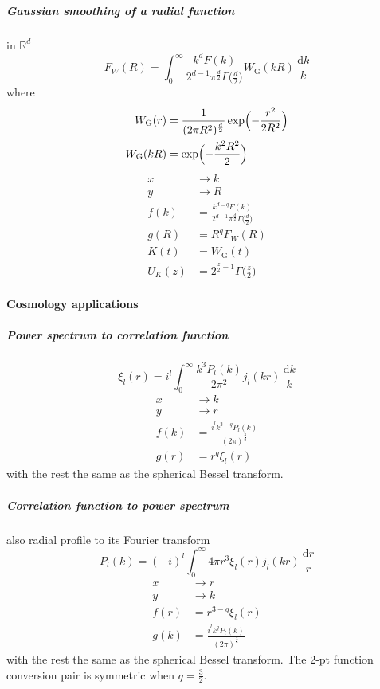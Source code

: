 \documentclass{article}
\renewcommand{\d}{\mathrm{d}}
\newcommand{\Mellin}{U}
\newcommand{\Gauss}{\mathrm{G}}
\begin{document}
\subparagraph{Gaussian smoothing of a radial function}
in $\mathbb{R}^d$
\begin{equation}
    F_W(R) = \int_0^\infty \frac{k^d F(k)}{2^{d-1}\pi^\frac{d}2\Gamma\bigl(\frac{d}2\bigr)}
                    W_\Gauss(kR) \,\frac{\d k}k
\end{equation}
where
\begin{align}
    W_\Gauss(r) &= \frac1{(2\pi R^2)^\frac{d}2} \exp\Bigl(-\frac{r^2}{2R^2}\Bigr) \\
    W_\Gauss(kR) &= \exp\Bigl(-\frac{k^2R^2}2\Bigr)
\end{align}
\begin{align}
    x &\to k \\
    y &\to R \\
    f(k) &= \frac{k^{d-q}F(k)}{2^{d-1}\pi^\frac{d}2\Gamma\bigl(\frac{d}2\bigr)} \\
    g(R) &= R^q F_W(R) \\
    K(t) &= W_\Gauss(t) \\
    \Mellin_K(z) &= 2^{\frac{z}2-1} \Gamma\bigl(\tfrac{z}2\bigr)
\end{align}


\paragraph{Cosmology applications}


\subparagraph{Power spectrum to correlation function}
\begin{equation}
    \xi_l(r) = i^l \int_0^\infty \frac{k^3P_l(k)}{2\pi^2} j_l(kr) \,\frac{\d k}k
\end{equation}
\begin{align}
    x &\to k \\
    y &\to r \\
    f(k) &= \frac{i^l k^{3-q} P_l(k)}{(2\pi)^\frac32} \\
    g(r) &= r^q \xi_l(r)
\end{align}
with the rest the same as the spherical Bessel transform.


\subparagraph{Correlation function to power spectrum}
also radial profile to its Fourier transform
\begin{equation}
    P_l(k) = (-i)^l \int_0^\infty 4\pi r^3\xi_l(r) j_l(kr) \,\frac{\d r}r
\end{equation}
\begin{align}
    x &\to r \\
    y &\to k \\
    f(r) &= r^{3-q} \xi_l(r) \\
    g(k) &= \frac{i^l k^q P_l(k)}{(2\pi)^\frac32}
\end{align}
with the rest the same as the spherical Bessel transform.
The 2-pt function conversion pair is symmetric when $q=\frac32$.
\end{document}
